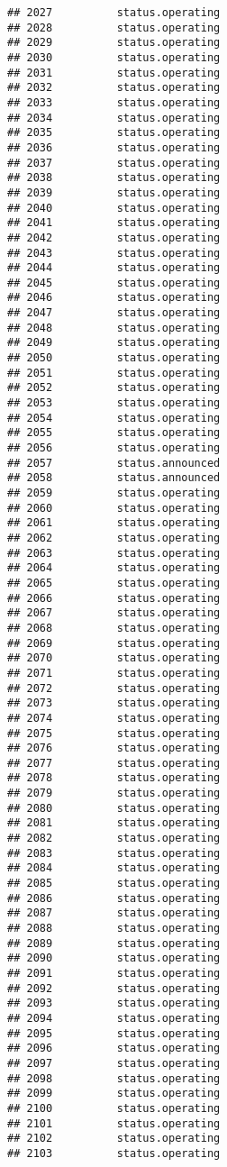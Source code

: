 \documentclass[
]{article}
\begin{document}
\begin{verbatim}
## 2027          status.operating
## 2028          status.operating
## 2029          status.operating
## 2030          status.operating
## 2031          status.operating
## 2032          status.operating
## 2033          status.operating
## 2034          status.operating
## 2035          status.operating
## 2036          status.operating
## 2037          status.operating
## 2038          status.operating
## 2039          status.operating
## 2040          status.operating
## 2041          status.operating
## 2042          status.operating
## 2043          status.operating
## 2044          status.operating
## 2045          status.operating
## 2046          status.operating
## 2047          status.operating
## 2048          status.operating
## 2049          status.operating
## 2050          status.operating
## 2051          status.operating
## 2052          status.operating
## 2053          status.operating
## 2054          status.operating
## 2055          status.operating
## 2056          status.operating
## 2057          status.announced
## 2058          status.announced
## 2059          status.operating
## 2060          status.operating
## 2061          status.operating
## 2062          status.operating
## 2063          status.operating
## 2064          status.operating
## 2065          status.operating
## 2066          status.operating
## 2067          status.operating
## 2068          status.operating
## 2069          status.operating
## 2070          status.operating
## 2071          status.operating
## 2072          status.operating
## 2073          status.operating
## 2074          status.operating
## 2075          status.operating
## 2076          status.operating
## 2077          status.operating
## 2078          status.operating
## 2079          status.operating
## 2080          status.operating
## 2081          status.operating
## 2082          status.operating
## 2083          status.operating
## 2084          status.operating
## 2085          status.operating
## 2086          status.operating
## 2087          status.operating
## 2088          status.operating
## 2089          status.operating
## 2090          status.operating
## 2091          status.operating
## 2092          status.operating
## 2093          status.operating
## 2094          status.operating
## 2095          status.operating
## 2096          status.operating
## 2097          status.operating
## 2098          status.operating
## 2099          status.operating
## 2100          status.operating
## 2101          status.operating
## 2102          status.operating
## 2103          status.operating

\end{verbatim}
\end{document}
